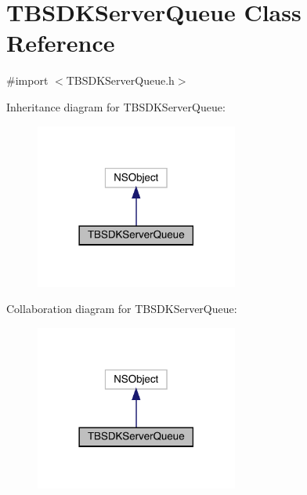 \hypertarget{interface_t_b_s_d_k_server_queue}{}\section{T\+B\+S\+D\+K\+Server\+Queue Class Reference}
\label{interface_t_b_s_d_k_server_queue}


{\ttfamily \#import $<$T\+B\+S\+D\+K\+Server\+Queue.\+h$>$}



Inheritance diagram for T\+B\+S\+D\+K\+Server\+Queue\+:\nopagebreak
\begin{figure}[H]
\begin{center}
\leavevmode
\includegraphics[width=189pt]{interface_t_b_s_d_k_server_queue__inherit__graph}
\end{center}
\end{figure}


Collaboration diagram for T\+B\+S\+D\+K\+Server\+Queue\+:\nopagebreak
\begin{figure}[H]
\begin{center}
\leavevmode
\includegraphics[width=189pt]{interface_t_b_s_d_k_server_queue__coll__graph}
\end{center}
\end{figure}

